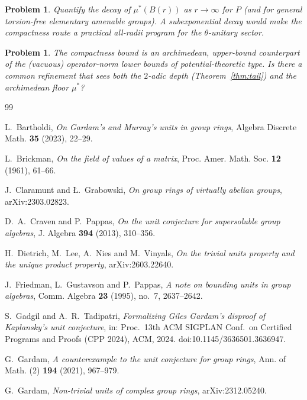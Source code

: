 \documentclass[11pt]{article}
\newtheorem{problem}[theorem]{Problem}
\begin{document}
\begin{problem}\label{prob:decay}
Quantify the decay of $\mu^*(B(r))$ as $r\to\infty$ for $P$ (and for
general torsion-free elementary amenable groups).  A subexponential
decay would make the compactness route a practical all-radii
program for the $\theta$-unitary sector.
\end{problem}

\begin{problem}
The compactness bound is an archimedean, upper-bound counterpart of
the (vacuous) operator-norm lower bounds of potential-theoretic type.
Is there a common refinement that sees both the $2$-adic depth
(Theorem~\ref{thm:tail}) and the archimedean floor $\mu^*$?
\end{problem}

\begin{thebibliography}{99}

 L.~Bartholdi, \emph{On Gardam's and Murray's
units in group rings}, Algebra Discrete Math. \textbf{35} (2023),
22--29.

 L.~Brickman, \emph{On the field of values of a
matrix}, Proc. Amer. Math. Soc. \textbf{12} (1961), 61--66.

 J.~Claramunt and {\L}.~Grabowski,
\emph{On group rings of virtually abelian groups}, arXiv:2303.02823.

 D.~A.~Craven and P.~Pappas, \emph{On the
unit conjecture for supersoluble group algebras}, J. Algebra
\textbf{394} (2013), 310--356.

 H.~Dietrich, M.~Lee, A.~Nies and M.~Vinyals,
\emph{On the trivial units property and the unique product property},
arXiv:2603.22640.

 J.~Friedman, L.~Gustavson and P.~Pappas, \emph{A
note on bounding units in group algebras}, Comm. Algebra \textbf{23}
(1995), no.~7, 2637--2642.

 S.~Gadgil and A.~R.~Tadipatri,
\emph{Formalizing Giles Gardam's disproof of Kaplansky's unit
conjecture}, in: Proc.\ 13th ACM SIGPLAN Conf.\ on Certified Programs
and Proofs (CPP 2024), ACM, 2024. doi:10.1145/3636501.3636947.

 G.~Gardam, \emph{A counterexample to the unit
conjecture for group rings}, Ann. of Math. (2) \textbf{194} (2021),
967--979.

 G.~Gardam, \emph{Non-trivial units of
complex group rings}, arXiv:2312.05240.


\end{thebibliography}
\end{document}
